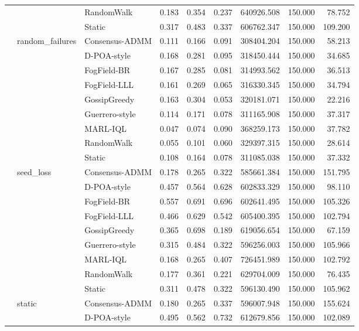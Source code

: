 \begin{table}
\begin{tabular}{lllrrrrrr}
 &  & RandomWalk & 0.183 & 0.354 & 0.237 & 640926.508 & 150.000 & 78.752 \\
 &  & Static & 0.317 & 0.483 & 0.337 & 606762.347 & 150.000 & 109.200 \\
\cline{2-9}
 & \multirow[t]{9}{*}{random\_failures} & Consensus-ADMM & 0.111 & 0.166 & 0.091 & 308404.204 & 150.000 & 58.213 \\
 &  & D-POA-style & 0.168 & 0.281 & 0.095 & 318450.444 & 150.000 & 34.685 \\
 &  & FogField-BR & 0.167 & 0.285 & 0.081 & 314993.562 & 150.000 & 36.513 \\
 &  & FogField-LLL & 0.161 & 0.269 & 0.065 & 316330.345 & 150.000 & 34.794 \\
 &  & GossipGreedy & 0.163 & 0.304 & 0.053 & 320181.071 & 150.000 & 22.216 \\
 &  & Guerrero-style & 0.114 & 0.171 & 0.078 & 311165.908 & 150.000 & 37.317 \\
 &  & MARL-IQL & 0.047 & 0.074 & 0.090 & 368259.173 & 150.000 & 37.782 \\
 &  & RandomWalk & 0.055 & 0.101 & 0.060 & 329397.315 & 150.000 & 28.614 \\
 &  & Static & 0.108 & 0.164 & 0.078 & 311085.038 & 150.000 & 37.332 \\
\cline{2-9}
 & \multirow[t]{9}{*}{seed\_loss} & Consensus-ADMM & 0.178 & 0.265 & 0.322 & 585661.384 & 150.000 & 151.795 \\
 &  & D-POA-style & 0.457 & 0.564 & 0.628 & 602833.329 & 150.000 & 98.110 \\
 &  & FogField-BR & 0.557 & 0.691 & 0.696 & 602641.495 & 150.000 & 105.326 \\
 &  & FogField-LLL & 0.466 & 0.629 & 0.542 & 605400.395 & 150.000 & 102.794 \\
 &  & GossipGreedy & 0.365 & 0.698 & 0.189 & 619056.654 & 150.000 & 67.159 \\
 &  & Guerrero-style & 0.315 & 0.484 & 0.322 & 596256.003 & 150.000 & 105.966 \\
 &  & MARL-IQL & 0.168 & 0.265 & 0.407 & 726451.989 & 150.000 & 102.792 \\
 &  & RandomWalk & 0.177 & 0.361 & 0.221 & 629704.009 & 150.000 & 76.435 \\
 &  & Static & 0.311 & 0.478 & 0.322 & 596130.490 & 150.000 & 105.962 \\
\cline{2-9}
 & \multirow[t]{9}{*}{static} & Consensus-ADMM & 0.180 & 0.265 & 0.337 & 596007.948 & 150.000 & 155.624 \\
 &  & D-POA-style & 0.495 & 0.562 & 0.732 & 612679.856 & 150.000 & 102.089 \\

\end{tabular}
\end{table}
